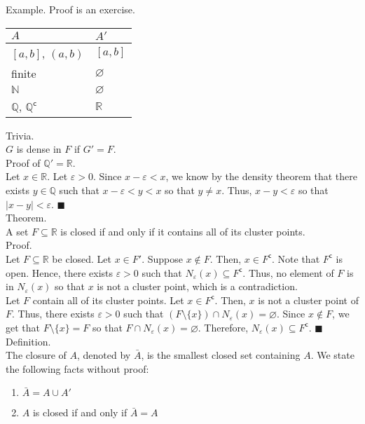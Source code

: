 \documentclass[twocolumn]{article}
\newcommand{\qed}{$\blacksquare$}
\newcommand{\br}{\vspace{\baselineskip}}
\newcommand{\COMPLEMENT}{^\mathsf{c}}
\let\complement\COMPLEMENT
\let\emptyset\varnothing
\let\eps\varepsilon
\newcommand{\naturals}{\mathbb{N}}
\newcommand{\rationals}{\mathbb{Q}}
\newcommand{\irrationals}{\rationals\complement}
\newcommand{\reals}{\mathbb{R}}
\begin{document}
Example. Proof is an exercise. \\
\begin{tabular}{l | l}
$A$ & $A'$ \\ \hline
$[a, b]$, $(a, b)$ & $[a, b]$ \\
finite & $\emptyset$ \\
$\naturals$ & $\emptyset$ \\
$\rationals$, $\irrationals$ & $\reals$
\end{tabular} \br

Trivia. \\
$G$ is dense in $F$ if $G' = F$. \\

Proof of $\rationals' = \reals$. \\
Let $x \in \reals$. Let $\eps > 0$. Since $x - \eps < x$, we know by the density theorem that there exists $y \in \rationals$ such that $x - \eps < y < x$ so that $y \neq x$. Thus, $x - y < \eps$ so that $|x - y| < \eps$. \qed \\

Theorem. \\
A set $F \subseteq \reals$ is closed if and only if it contains all of its cluster points. \\
Proof. \\
Let $F \subseteq \reals$ be closed. Let $x \in F'$. Suppose $x \not\in F$. Then, $x \in F\complement$. Note that $F\complement$ is open. Hence, there exists $\eps > 0$ such that $N_\eps(x) \subseteq F\complement$. Thus, no element of $F$ is in $N_\eps(x)$ so that $x$ is not a cluster point, which is a contradiction. \\
Let $F$ contain all of its cluster points. Let $x \in F\complement$. Then, $x$ is not a cluster point of $F$. Thus, there exists $\eps > 0$ such that $(F \setminus \{ x \}) \cap N_\eps(x) = \emptyset$. Since $x \not\in F$, we get that $F \setminus \{ x \} = F$ so that $F \cap N_\eps(x) = \emptyset$. Therefore, $N_\eps(x) \subseteq F\complement$. \qed \\

Definition. \\
The closure of $A$, denoted by $\bar{A}$, is the smallest closed set containing $A$. We state the following facts without proof:
\begin{enumerate}
	\item
		$\bar{A} = A \cup A'$
	\item
		$A$ is closed if and only if $\bar{A} = A$
\end{enumerate} \br
\end{document}

